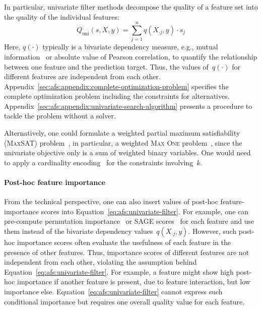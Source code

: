 \documentclass{article}
\theoremstyle{definition}
\begin{document}
In particular, univariate filter methods decompose the quality of a feature set into the quality of the individual features:
%
\begin{equation}
	Q_{\text{uni}}(s,X,y) = \sum_{j=1}^{n} q(X_{\cdot{}j},y) \cdot s_j
	\label{eq:afs:univariate-filter}
\end{equation}
%
Here, $q(\cdot)$ typically is a bivariate dependency measure, e.g., mutual information~\cite{kraskov2004estimating} or absolute value of Pearson correlation, to quantify the relationship between one feature and the prediction target.
Thus, the values of~$q(\cdot)$ for different features are independent from each other.
Appendix~\ref{sec:afs:appendix:complete-optimization-problem} specifies the complete optimization problem including the constraints for alternatives.
Appendix~\ref{sec:afs:appendix:univariate-search-algorithm} presents a procedure to tackle the problem without a solver.

Alternatively, one could formulate a weighted partial maximum satisfiability (\textsc{MaxSAT}) problem~\cite{bacchus2021maximum, li2021maxsat}, in particular, a weighted \textsc{Max One} problem~\cite{khanna1997complete}, since the univariate objective only is a sum of weighted binary variables.
One would need to apply a cardinality encoding~\cite{sinz2005towards} for the constraints involving~$k$.

\paragraph{Post-hoc feature importance}

From the technical perspective, one can also insert values of post-hoc feature-importance scores into Equation~\ref{eq:afs:univariate-filter}.
For example, one can pre-compute permutation importance~\cite{breiman2001random} or SAGE scores~\cite{covert2020understanding} for each feature and use them instead of the bivariate dependency values~$q(X_{\cdot{}j},y)$.
However, such post-hoc importance scores often evaluate the usefulness of each feature in the presence of other features.
Thus, importance scores of different features are not independent from each other, violating the assumption behind Equation~\ref{eq:afs:univariate-filter}.
For example, a feature might show high post-hoc importance if another feature is present, due to feature interaction, but low importance else.
Equation~\ref{eq:afs:univariate-filter} cannot express such conditional importance but requires one overall quality value for each feature.
\end{document}
